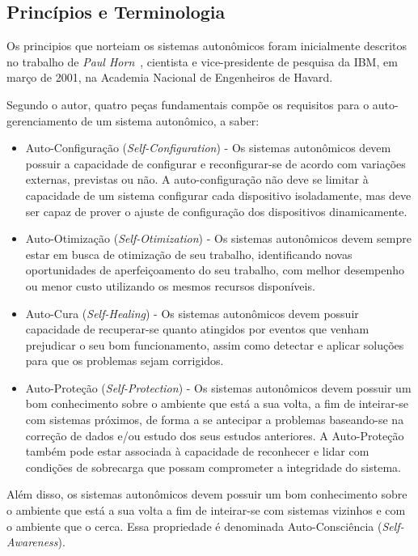 \documentclass[11pt,twoside]{article}
\begin{document}
\subsection{Princípios e Terminologia}
Os principios que norteiam os sistemas autonômicos foram inicialmente descritos no trabalho de \textit{Paul Horn}~\cite{KEPHART}, cientista e vice-presidente de pesquisa da IBM, em março de 2001, na Academia Nacional de Engenheiros de Havard. 

Segundo o autor, quatro peças fundamentais compõe os requisitos para o auto-gerenciamento de um sistema autonômico, a saber:

\begin{itemize}

\item Auto-Configuração (\textit{Self-Configuration}) - Os sistemas autonômicos devem possuir a capacidade de configurar e reconfigurar-se de acordo com variações externas, previstas ou não. A auto-configuração não deve se limitar à capacidade de um sistema configurar cada dispositivo isoladamente, mas deve ser capaz de prover o ajuste de configuração dos dispositivos dinamicamente.

\item Auto-Otimização (\textit{Self-Otimization}) - Os sistemas autonômicos devem sempre estar em busca de otimização de seu trabalho, identificando novas oportunidades de aperfeiçoamento do seu trabalho, com melhor desempenho ou menor custo utilizando os mesmos recursos disponíveis.

\item Auto-Cura (\textit{Self-Healing}) - Os sistemas autonômicos devem possuir capacidade de recuperar-se quanto atingidos por eventos que venham prejudicar o seu bom funcionamento, assim como detectar e aplicar soluções para que os problemas sejam corrigidos. 

\item Auto-Proteção (\textit{Self-Protection}) - Os sistemas autonômicos devem possuir um bom conhecimento sobre o ambiente que está a sua volta, a fim de inteirar-se com sistemas próximos, de forma a se antecipar a problemas baseando-se na correção de dados e/ou estudo dos seus estudos anteriores. A Auto-Proteção também pode estar associada à capacidade de reconhecer e lidar com condições de sobrecarga que possam comprometer a integridade do sistema.
\end{itemize}

Além disso, os sistemas autonômicos devem possuir um bom conhecimento sobre o ambiente que está a sua volta a fim de inteirar-se com sistemas vizinhos e com o ambiente que o cerca. Essa propriedade é denominada Auto-Consciência (\textit{Self-Awareness}).
\end{document}
